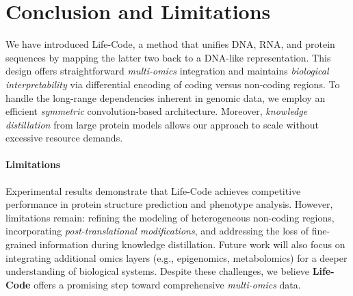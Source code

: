 \section{Conclusion and Limitations}
We have introduced Life-Code, a method that unifies DNA, RNA, and protein sequences by mapping the latter two back to a DNA-like representation. This design offers straightforward \emph{multi-omics} integration and maintains \emph{biological interpretability} via differential encoding of coding versus non-coding regions. To handle the long-range dependencies inherent in genomic data, we employ an efficient \emph{symmetric} convolution-based architecture. Moreover, \emph{knowledge distillation} from large protein models allows our approach to scale without excessive resource demands.

\paragraph{Limitations} Experimental results demonstrate that Life-Code achieves competitive performance in protein structure prediction and phenotype analysis. However, limitations remain: refining the modeling of heterogeneous non-coding regions, incorporating \emph{post-translational modifications}, and addressing the loss of fine-grained information during knowledge distillation. Future work will also focus on integrating additional omics layers (e.g., epigenomics, metabolomics) for a deeper understanding of biological systems. Despite these challenges, we believe \textbf{Life-Code} offers a promising step toward comprehensive \emph{multi-omics} data. 


